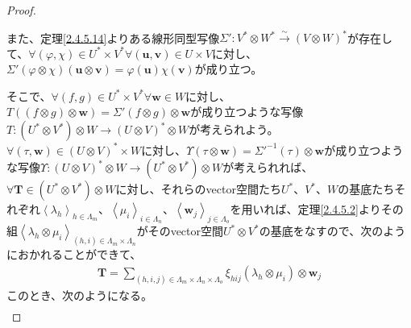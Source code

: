 \documentclass[dvipdfmx]{jsarticle}
\begin{document}
\begin{proof}
\begin{center}
\end{center}
また、定理\ref{2.4.5.14}よりある線形同型写像$\varSigma':V^{*} \otimes W^{*}\overset{\sim}{\rightarrow}(V \otimes W)^{*}$が存在して、$\forall(\varphi,\chi) \in U^{*} \times V^{*}\forall\left( \mathbf{u},\mathbf{v} \right) \in U \times V$に対し、$\varSigma'(\varphi \otimes \chi)\left( \mathbf{u} \otimes \mathbf{v} \right) = \varphi\left( \mathbf{u} \right)\chi\left( \mathbf{v} \right)$が成り立つ。\par
そこで、$\forall(f,g) \in U^{*} \times V^{*}\forall\mathbf{w} \in W$に対し、$T\left( (f \otimes g) \otimes \mathbf{w} \right) = \varSigma'(f \otimes g) \otimes \mathbf{w}$が成り立つような写像$T:\left( U^{*} \otimes V^{*} \right) \otimes W \rightarrow (U \otimes V)^{*} \otimes W$が考えられよう。$\forall\left( \tau,\mathbf{w} \right) \in (U \otimes V)^{*} \times W$に対し、$\varUpsilon\left( \tau \otimes \mathbf{w} \right) = {\varSigma'}^{- 1}(\tau) \otimes \mathbf{w}$が成り立つような写像$\varUpsilon:(U \otimes V)^{*} \otimes W \rightarrow \left( U^{*} \otimes V^{*} \right) \otimes W$が考えられれば、$\forall\mathbf{T} \in \left( U^{*} \otimes V^{*} \right) \otimes W$に対し、それらのvector空間たち$U^{*}$、$V^{*}$、$W$の基底たちそれぞれ$\left\langle \lambda_{h} \right\rangle_{h \in \varLambda_{m}}$、$\left\langle \mu_{i} \right\rangle_{i \in \varLambda_{n}}$、$\left\langle \mathbf{w}_{j} \right\rangle_{j \in \varLambda_{o}}$を用いれば、定理\ref{2.4.5.2}よりその組$\left\langle \lambda_{h} \otimes \mu_{i} \right\rangle_{(h,i) \in \varLambda_{m} \times \varLambda_{n}}$がそのvector空間$U^{*} \otimes V^{*}$の基底をなすので、次のようにおかれることができて、
\begin{align*}
\mathbf{T} = \sum_{(h,i,j) \in \varLambda_{m} \times \varLambda_{n} \times \varLambda_{o}} {\xi_{hij}\left( \lambda_{h} \otimes \mu_{i} \right) \otimes \mathbf{w}_{j}}
\end{align*}
このとき、次のようになる。
\begin{align*}

\end{align*}
\end{proof}
\end{document}
